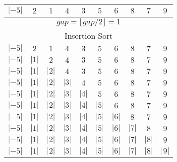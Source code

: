 \documentclass{article}
\begin{document}
\begin{center}
\begin{tabular}{ | c | c | c | c | c | c | c | c | c | c | }
                \hline
                $|-5|$ & $2$ & $1$ & $4$ & $3$ & $5$ & $6$ & $8$ & $7$ & $9$ \\
                \hline
                \multicolumn{10}{|c|}{$gap = \lfloor gap / 2\rfloor = 1$} \\
                \multicolumn{10}{|c|}{Insertion Sort} \\
                \hline
                $|-5|$ & $2$ & $1$ & $4$ & $3$ & $5$ & $6$ & $8$ & $7$ & $9$ \\
                \hline
                $|-5|$ & $|1|$ & $2$ & $4$ & $3$ & $5$ & $6$ & $8$ & $7$ & $9$
                \\
                \hline
                $|-5|$ & $|1|$ & $|2|$ & $4$ & $3$ & $5$ & $6$ & $8$ & $7$ &
                $9$ \\
                \hline
                $|-5|$ & $|1|$ & $|2|$ & $|3|$ & $4$ & $5$ & $6$ & $8$ & $7$ &
                $9$ \\
                \hline
                $|-5|$ & $|1|$ & $|2|$ & $|3|$ & $|4|$ & $5$ & $6$ & $8$ & $7$
                & $9$ \\
                \hline
                $|-5|$ & $|1|$ & $|2|$ & $|3|$ & $|4|$ & $|5|$ & $6$ & $8$ &
                $7$ & $9$ \\
                \hline
                $|-5|$ & $|1|$ & $|2|$ & $|3|$ & $|4|$ & $|5|$ & $|6|$ & $8$ &
                $7$ & $9$ \\
                \hline
                $|-5|$ & $|1|$ & $|2|$ & $|3|$ & $|4|$ & $|5|$ & $|6|$ & $|7|$
                & $8$ & $9$ \\
                \hline
                $|-5|$ & $|1|$ & $|2|$ & $|3|$ & $|4|$ & $|5|$ & $|6|$ & $|7|$
                & $|8|$ & $9$ \\
                \hline
                $|-5|$ & $|1|$ & $|2|$ & $|3|$ & $|4|$ & $|5|$ & $|6|$ & $|7|$
                & $|8|$ & $|9|$ \\
                \hline

                          \end{tabular}
        \end{center}
\end{document}
